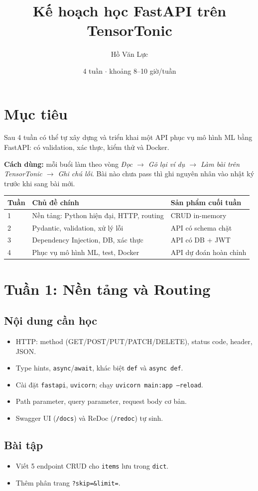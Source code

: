 \documentclass[11pt,a4paper]{article}
\title{Kế hoạch học FastAPI trên TensorTonic}
\author{Hồ Văn Lực}
\date{4 tuần $\cdot$ khoảng 8--10 giờ/tuần}
\newcommand{\week}[2]{\section{Tuần #1: #2}}
\begin{document}
\maketitle

\section*{Mục tiêu}
Sau 4 tuần có thể tự xây dựng và triển khai một API phục vụ mô hình ML bằng FastAPI: có validation, xác thực, kiểm thử và Docker.

\textbf{Cách dùng:} mỗi buổi làm theo vòng \emph{Đọc $\to$ Gõ lại ví dụ $\to$ Làm bài trên TensorTonic $\to$ Ghi chú lỗi}. Bài nào chưa pass thì ghi nguyên nhân vào nhật ký trước khi sang bài mới.

\begin{tabularx}{\textwidth}{@{}lXl@{}}
\toprule
Tuần & Chủ đề chính & Sản phẩm cuối tuần \\
\midrule
1 & Nền tảng: Python hiện đại, HTTP, routing & CRUD in-memory \\
2 & Pydantic, validation, xử lý lỗi & API có schema chặt \\
3 & Dependency Injection, DB, xác thực & API có DB + JWT \\
4 & Phục vụ mô hình ML, test, Docker & API dự đoán hoàn chỉnh \\
\bottomrule
\end{tabularx}

\week{1}{Nền tảng và Routing}
\subsection*{Nội dung cần học}
\begin{itemize}
  \item HTTP: method (GET/POST/PUT/PATCH/DELETE), status code, header, JSON.
  \item Type hints, \texttt{async}/\texttt{await}, khác biệt \texttt{def} và \texttt{async def}.
  \item Cài đặt \texttt{fastapi}, \texttt{uvicorn}; chạy \texttt{uvicorn main:app --reload}.
  \item Path parameter, query parameter, request body cơ bản.
  \item Swagger UI (\texttt{/docs}) và ReDoc (\texttt{/redoc}) tự sinh.
\end{itemize}
\subsection*{Bài tập}
\begin{itemize}
  \item Viết 5 endpoint CRUD cho \texttt{items} lưu trong \texttt{dict}.
  \item Thêm phân trang \texttt{?skip=\&limit=}.
\end{itemize}
\end{document}
